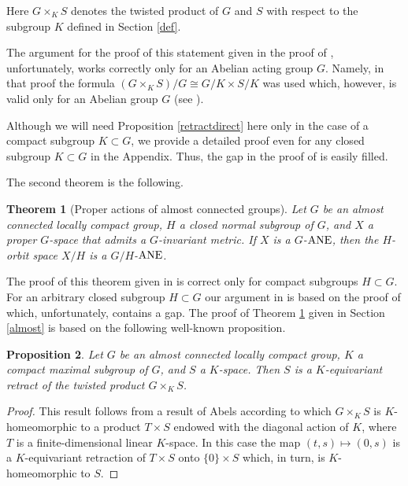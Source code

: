 \documentclass{amsart}
\newtheorem{theorem}{Theorem}[section]
\newtheorem{proposition}[theorem]{Proposition}
\begin{document}
   Here ${G \times_K S}$ denotes the twisted product of $G$ and $S$ with respect to the subgroup $K$ defined in Section \ref{def}.
      
The argument for the proof of this statement  given in the proof of \cite[Theorem 6.4]{ant:jap}, unfortunately,  works correctly only for an Abelian acting group $G$.  Namely,  in  that  proof 
 the formula  $(G \times_K S)/G\cong G/K\times S/K$ was used  which, however, is valid only for an Abelian group $G$ (see \cite[Proposition 2]{ant:99}).
 
  Although  we will need  Proposition \ref{retractdirect} here only in the case of a compact subgroup $K\subset G$, we provide
 a detailed proof  even for any closed subgroup $K\subset G$ in the Appendix.
  Thus,  the gap in the proof  of \cite[Theorem 6.4]{ant:jap} is easily filled.
 
 \medskip
  
  
   The second theorem is the following.
 
   \begin{theorem}[Proper actions of almost connected groups]\label{T:almost} Let $G$ be an almost connected locally compact group,  $H$  a closed normal subgroup of $G$, and $X$   a proper $G$-space that admits a $G$-invariant metric.   If 
 $X$ is a $G$-${\rm ANE}$, then the $H$-orbit space  $X/H$ is a $G/H$-${\rm ANE}$. 
\end{theorem}   
  The proof of this theorem given in \cite[Theorem 3(1)]{ant:99} is correct only for compact subgroups $H\subset G$. For an arbitrary closed subgroup $H\subset G$ our argument in  \cite[Theorem 3(3)]{ant:99}  is based on \cite[Proposition 8(1)]{ant:99} the proof of which, unfortunately, contains a gap.
  The proof of  Theorem \ref{T:almost} given in Section  \ref{almost}  is based on the following well-known proposition.

   
          \medskip
  
    \begin{proposition}\label{abels} Let $G$ be an almost connected locally compact group, $K$ a compact  maximal  subgroup of $G$, and $S$  a $K$-space. Then $S$ is a $K$-equivariant retract of the twisted product $G\times_K S$.
    \end{proposition}        
    \begin{proof}
     This result  follows from a result of  Abels \cite[Theorem~2.1]{abe:74} according to which $G\times_K
S$ is $K$-homeomorphic to a product $T\times S$ endowed with the diagonal action of $K$, where $T$
is a finite-dimensional linear $K$-space. In this case the map $(t, s)\mapsto (0, s)$ is a
$K$-equivariant retraction of $T\times S$ onto $\{0\}\times S$ which, in turn, is $K$-homeomorphic
to $S$.
 \end{proof}  
 
\end{document}
